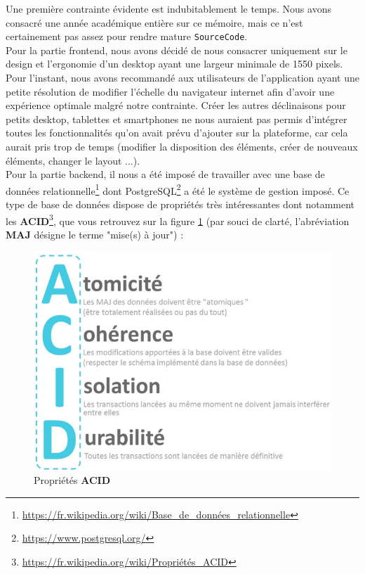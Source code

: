 Une première contrainte évidente est indubitablement le temps. Nous avons consacré une année académique entière sur ce mémoire, mais ce n'est certainement pas assez pour rendre mature \texttt{SourceCode}.\\

Pour la partie \gls{frontend}, nous avons décidé de nous consacrer uniquement sur le design et l'ergonomie d'un desktop ayant une largeur minimale de 1550 pixels. Pour l'instant, nous avons recommandé aux utilisateurs de l'application ayant une petite résolution de modifier l'échelle du navigateur internet afin d'avoir une expérience optimale malgré notre contrainte. Créer les autres déclinaisons pour petits desktop, tablettes et smartphones ne nous auraient pas permis d'intégrer toutes les fonctionnalités qu'on avait prévu d'ajouter sur la plateforme, car cela aurait pris trop de temps (modifier la disposition des éléments, créer de nouveaux éléments, changer le layout ...). \\

Pour la partie \gls{backend}, il nous a été imposé de travailler avec une base de données relationnelle\footnote{
    \href{https://fr.wikipedia.org/wiki/Base\_de\_donn\%C3\%A9es\_relationnelle}
    {https://fr.wikipedia.org/wiki/Base\_de\_données\_relationnelle}
} dont PostgreSQL\footnote{
    \url{https://www.postgresql.org/}
} a été le système de gestion imposé. Ce type de base de données dispose de propriétés très intéressantes dont notamment les \textbf{ACID}\footnote{
    \href{https://fr.wikipedia.org/wiki/Propri\%C3\%A9t\%C3\%A9s\_ACID}
    {https://fr.wikipedia.org/wiki/Propriétés\_ACID}
}, que vous retrouvez sur la figure \ref{pic:ACIDproperties} (par souci de clarté, l'abréviation \textbf{MAJ} désigne le terme "mise(s) à jour") :

\begin{figure}[H]
    \includegraphics[width=\textwidth,height=\textheight,keepaspectratio]{images/ACID.png}
    \centering
    \caption[Propriétés \textbf{ACID}]{Propriétés \textbf{ACID} \cite{bigdata_cap}}
    \label{pic:ACIDproperties}
\end{figure}

